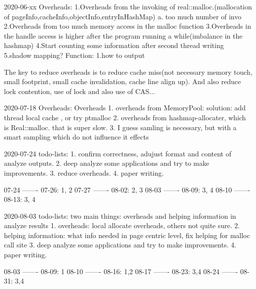 2020-06-xx
Overheads:
1.Overheads from the invoking of real::malloc.(mallocation of pageInfo,cacheInfo,objectInfo,entryInHashMap)
a. too much number of invo
2.Overheads from too much memory access in the malloc function
3.Overheads in the handle access is higher after the program running a while(imbalance in the hashmap)
4.Start counting some information after second thread writing
5.shadow mapping?
Function:
1.how to output

The key to reduce overheads is to reduce cache miss(not necessary memory touch, small footprint, small cache invalidation, cache line align up).
And also reduce lock contention, use of lock and also use of CAS...


2020-07-18 Overheads:
Overheads
1. overheads from MemoryPool:
solution: add thread local cache , or try ptmalloc
2. overheads from hashmap-allocater, which is Real::malloc. that is super slow.
3. I guess samling is necessary, but with a smart sampling which do not influence it effects




2020-07-24 todo-lists:
1. confirm correctness, adujust format and content of analyze outputs.
2. deep analyze some applications and try to make improvements.
3. reduce overheads.
4. paper writing.

07-24 ------- 07-26: 1, 2
07-27 ------- 08-02: 2, 3
08-03 ------- 08-09: 3, 4
08-10 ------- 08-13: 3, 4

2020-08-03 todo-lists:
two main things: overheads and helping information in analyze results
    1. overheads: local allocate overheads, others not quite sure.
    2. helping information: what info needed in page centric level, fix helping for malloc call site
    3. deep analyze some applications and try to make improvements.
    4. paper writing.

08-03 ------- 08-09: 1
08-10 ------- 08-16: 1,2
08-17 ------- 08-23: 3,4
08-24 ------- 08-31: 3,4


